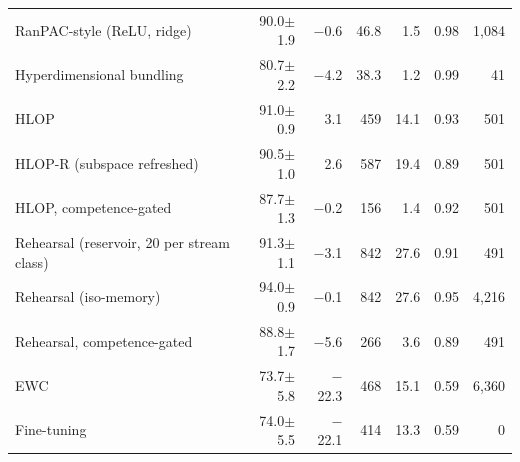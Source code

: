 \begin{tabular*}{\textwidth}{@{\extracolsep{\fill}}lrrrrrr@{}}
RanPAC-style (ReLU, ridge) & 90.0$\pm$1.9 & \ensuremath{-}0.6 & 46.8 & 1.5 & 0.98 & 1,084 \\
Hyperdimensional bundling & 80.7$\pm$2.2 & \ensuremath{-}4.2 & 38.3 & 1.2 & 0.99 & 41 \\
HLOP & 91.0$\pm$0.9 & 3.1 & 459 & 14.1 & 0.93 & 501 \\
HLOP-R (subspace refreshed) & 90.5$\pm$1.0 & 2.6 & 587 & 19.4 & 0.89 & 501 \\
HLOP, competence-gated & 87.7$\pm$1.3 & \ensuremath{-}0.2 & 156 & 1.4 & 0.92 & 501 \\
Rehearsal (reservoir, 20 per stream class) & 91.3$\pm$1.1 & \ensuremath{-}3.1 & 842 & 27.6 & 0.91 & 491 \\
Rehearsal (iso-memory) & 94.0$\pm$0.9 & \ensuremath{-}0.1 & 842 & 27.6 & 0.95 & 4,216 \\
Rehearsal, competence-gated & 88.8$\pm$1.7 & \ensuremath{-}5.6 & 266 & 3.6 & 0.89 & 491 \\
EWC & 73.7$\pm$5.8 & \ensuremath{-}22.3 & 468 & 15.1 & 0.59 & 6,360 \\
Fine-tuning & 74.0$\pm$5.5 & \ensuremath{-}22.1 & 414 & 13.3 & 0.59 & 0 \\
\bottomrule
\end{tabular*}

